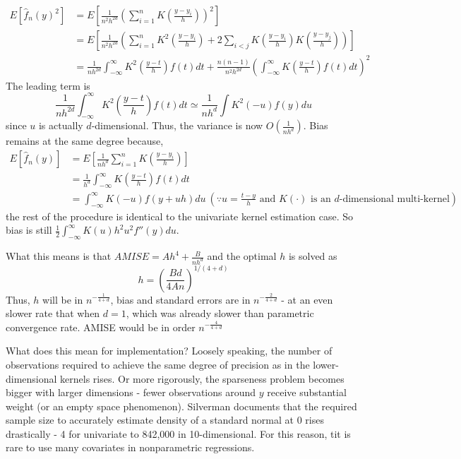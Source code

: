 \documentclass[12pt]{article}
\theoremstyle{definition}
\theoremstyle{property}
\theoremstyle{assumption}
\theoremstyle{example}
\theoremstyle{comment}
\begin{document}
 \footnotesize{\begin{align*}
 E[\hat{f}_n(y)^2]&=E\left[\frac{1}{n^2h^{2d}}\left(\sum_{i=1}^nK\left(\frac{y-y_i}{h}\right)\right)^2\right]\\
 &=E\left[\frac{1}{n^2h^{2d}}\left(\sum_{i=1}^nK^2\left(\frac{y-y_i}{h}\right)+2\sum_{i<j} K\left(\frac{y-y_i}{h}\right)K\left(\frac{y-y_j}{h}\right)\right)\right]\\
 &=\frac{1}{nh^{2d}}\int_{-\infty}^\infty K^2\left(\frac{y-t}{h}\right)f(t)dt+\frac{n(n-1)}{n^2h^{2d}}\left(\int_{-\infty}^\infty K\left(\frac{y-t}{h}\right)f(t)dt\right)^2
 \end{align*}}\normalsize
The leading term is
 \[
\frac{1}{nh^{2d}}\int_{-\infty}^\infty K^2\left(\frac{y-t}{h}\right)f(t)dt \simeq \frac{1}{nh^d}\int K^2(-u)f(y)du
 \]
 since $u$ is actually $d$-dimensional. Thus, the variance is now $O\left(\frac{1}{nh^d}\right)$. Bias remains at the same degree because, 
 \begin{align*}
  E[\hat{f}_n(y)]&=E\left[ \frac{1}{nh^d}\sum_{i=1}^nK\left(\frac{y-y_i}{h}\right) \right]\\
  &=\frac{1}{h^d}\int_{-\infty}^\infty K\left(\frac{y-t}{h}\right)f(t)dt\\
    &=\int_{-\infty}^\infty K(-u)f(y+uh)du \ (\because\text{$u=\frac{t-y}{h}$ and $K(\cdot)$ is an $d$-dimensional multi-kernel})
 \end{align*}
 the rest of the procedure is identical to the univariate kernel estimation case. So bias is still $\frac{1}{2}\int_{-\infty}^\infty K(u)h^2u^2f''(y)du$. \par
  What this means is that $AMISE=Ah^4+\frac{B}{nh^d}$ and the optimal $h$ is solved as
 \[
 h=\left(\frac{Bd}{4An}\right)^{1/(4+d)}
 \]
 Thus, $h$ will be in $n^{-\frac{1}{4+d}}$, bias and standard errors are in $n^{-\frac{2}{4+d}}$ - at an even slower rate that when $d=1$, which was already slower than parametric convergence rate. AMISE would be in order $n^{-\frac{4}{4+d}}$\par
What does this mean for implementation? Loosely speaking, the number of observations required to achieve the same degree of precision as in the lower-dimensional kernels rises. Or more rigorously, the sparseness problem becomes bigger with larger dimensions - fewer observations around $y$ receive substantial weight (or an empty space phenomenon). Silverman documents that the required sample size to accurately estimate density of a standard normal at $0$ rises drastically - 4 for univariate to 842,000 in 10-dimensional. For this reason, tit is rare to use many covariates in nonparametric regressions. \par
 
\end{document}
